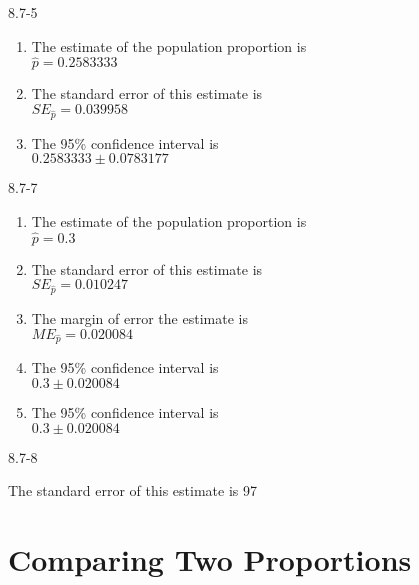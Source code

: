 \begin{exsol@solution}{8.7-5}

\begin{enumerate}
\item	The estimate of the population proportion is \\ $\hat{p} = 0.2583333$
\item	The standard error of this estimate is \\ $SE_{\hat{p}} = 0.039958$
\item	The 95\% confidence interval is \\ $0.2583333 \pm 0.0783177$
\end{enumerate}
\end{exsol@solution}
\begin{exsol@solution}{8.7-7}

\begin{enumerate}
\item	The estimate of the population proportion is \\ $\hat{p} = 0.3$
\item	The standard error of this estimate is \\ $SE_{\hat{p}} = 0.010247$
\item The margin of error the estimate is \\ $ME_{\hat{p}} = 0.020084$
\item	The 95\% confidence interval is \\ $0.3 \pm 0.020084$
\item	The 95\% confidence interval is \\ $0.3 \pm 0.020084$
\end{enumerate}
\end{exsol@solution}
\begin{exsol@solution}{8.7-8}

The standard error of this estimate is 97

\end{exsol@solution}
\setcounter{chapter}{8}\chapter{Comparing Two Proportions }

